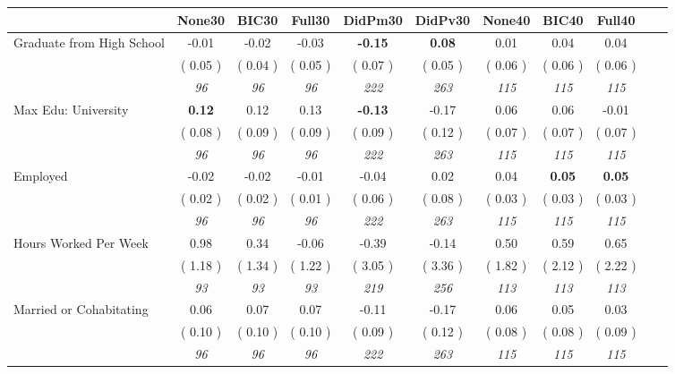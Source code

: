 \begin{tabular}{l c c c c c c c c c c}
\toprule
 & None30 & BIC30 & Full30 & DidPm30 & DidPv30 & None40 & BIC40 & Full40 \\
\midrule
Graduate from High School &     -0.01 &     -0.02 &     -0.03 & \textbf{     -0.15 } & \textbf{      0.08 } &      0.01 &      0.04 &      0.04 \\
& (     0.05 ) & (     0.04 ) & (     0.05 ) & (     0.07 ) & (     0.05 ) & (     0.06 ) & (     0.06 ) & (     0.06 ) \\
& \textit{ 96 } & \textit{ 96 } & \textit{ 96 } & \textit{ 222 } & \textit{ 263 } & \textit{ 115 } & \textit{ 115 } & \textit{ 115 } \\
Max Edu: University & \textbf{      0.12 } &      0.12 &      0.13 & \textbf{     -0.13 } &     -0.17 &      0.06 &      0.06 &     -0.01 \\
& (     0.08 ) & (     0.09 ) & (     0.09 ) & (     0.09 ) & (     0.12 ) & (     0.07 ) & (     0.07 ) & (     0.07 ) \\
& \textit{ 96 } & \textit{ 96 } & \textit{ 96 } & \textit{ 222 } & \textit{ 263 } & \textit{ 115 } & \textit{ 115 } & \textit{ 115 } \\
Employed &     -0.02 &     -0.02 &     -0.01 &     -0.04 &      0.02 &      0.04 & \textbf{      0.05 } & \textbf{      0.05 } \\
& (     0.02 ) & (     0.02 ) & (     0.01 ) & (     0.06 ) & (     0.08 ) & (     0.03 ) & (     0.03 ) & (     0.03 ) \\
& \textit{ 96 } & \textit{ 96 } & \textit{ 96 } & \textit{ 222 } & \textit{ 263 } & \textit{ 115 } & \textit{ 115 } & \textit{ 115 } \\
Hours Worked Per Week &      0.98 &      0.34 &     -0.06 &     -0.39 &     -0.14 &      0.50 &      0.59 &      0.65 \\
& (     1.18 ) & (     1.34 ) & (     1.22 ) & (     3.05 ) & (     3.36 ) & (     1.82 ) & (     2.12 ) & (     2.22 ) \\
& \textit{ 93 } & \textit{ 93 } & \textit{ 93 } & \textit{ 219 } & \textit{ 256 } & \textit{ 113 } & \textit{ 113 } & \textit{ 113 } \\
Married or Cohabitating &      0.06 &      0.07 &      0.07 &     -0.11 &     -0.17 &      0.06 &      0.05 &      0.03 \\
& (     0.10 ) & (     0.10 ) & (     0.10 ) & (     0.09 ) & (     0.12 ) & (     0.08 ) & (     0.08 ) & (     0.09 ) \\
& \textit{ 96 } & \textit{ 96 } & \textit{ 96 } & \textit{ 222 } & \textit{ 263 } & \textit{ 115 } & \textit{ 115 } & \textit{ 115 } \\

\end{tabular}
